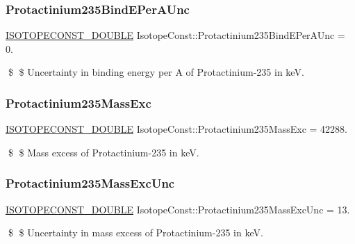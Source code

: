 \subsubsection{\texorpdfstring{Protactinium235\+Bind\+E\+Per\+A\+Unc}{Protactinium235BindEPerAUnc}}
{\footnotesize\ttfamily \mbox{\hyperlink{group___isotope_const-_macros_ga8f45a7272ce02c0b4c65c44636ed719a}{I\+S\+O\+T\+O\+P\+E\+C\+O\+N\+S\+T\+\_\+\+D\+O\+U\+B\+LE}} Isotope\+Const\+::\+Protactinium235\+Bind\+E\+Per\+A\+Unc = 0.}

\$ \$ Uncertainty in binding energy per A of Protactinium-\/235 in keV. \mbox{\label{group___isotope_const-_protactinium-_pa235_ga0dca2e169f029aebb60a7e247cff8e02}} 
\subsubsection{\texorpdfstring{Protactinium235\+Mass\+Exc}{Protactinium235MassExc}}
{\footnotesize\ttfamily \mbox{\hyperlink{group___isotope_const-_macros_ga8f45a7272ce02c0b4c65c44636ed719a}{I\+S\+O\+T\+O\+P\+E\+C\+O\+N\+S\+T\+\_\+\+D\+O\+U\+B\+LE}} Isotope\+Const\+::\+Protactinium235\+Mass\+Exc = 42288.}

\$ \$ Mass excess of Protactinium-\/235 in keV. \mbox{\label{group___isotope_const-_protactinium-_pa235_gafe8b67dbd3a8756364ea74343c18b149}} 
\subsubsection{\texorpdfstring{Protactinium235\+Mass\+Exc\+Unc}{Protactinium235MassExcUnc}}
{\footnotesize\ttfamily \mbox{\hyperlink{group___isotope_const-_macros_ga8f45a7272ce02c0b4c65c44636ed719a}{I\+S\+O\+T\+O\+P\+E\+C\+O\+N\+S\+T\+\_\+\+D\+O\+U\+B\+LE}} Isotope\+Const\+::\+Protactinium235\+Mass\+Exc\+Unc = 13.}

\$ \$ Uncertainty in mass excess of Protactinium-\/235 in keV. \mbox{\label{group___isotope_const-_protactinium-_pa235_ga5e0c3a1e933ba4377ab3d90fbb937cd6}} 
